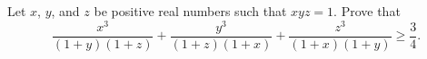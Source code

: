 Let $x$, $y$, and $z$ be positive real numbers such that $xyz = 1$. Prove that
\[ \frac{x^3}{(1+y)(1+z)} + \frac{y^3}{(1+z)(1+x)} + \frac{z^3}{(1+x)(1+y)} \geq \frac{3}{4}. \]

